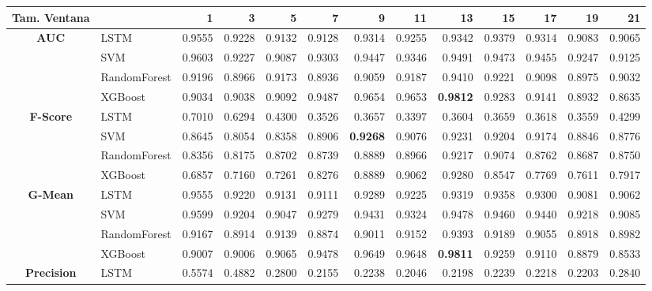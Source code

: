 \newpage
\begin{table}[h]
	\centering
	\begin{adjustbox}{max width=15cm}
		\begin{tabular}{|c|l|r|r|r|r|r|r|r|r|r|r|r|}
	\hline
	\textbf{Tam. Ventana}&         &      1  &      3  &      5  &      7  &      9  &      11 &      13 &      15 &      17 &      19 &      21 \\
	\hline
	\textbf{AUC} & LSTM &  0.9555 &  0.9228 &  0.9132 &  0.9128 &  0.9314 &  0.9255 &  0.9342 &  0.9379 &  0.9314 &  0.9083 &  0.9065 \\
	& SVM &  0.9603 &  0.9227 &  0.9087 &  0.9303 &  0.9447 &  0.9346 &  0.9491 &  0.9473 &  0.9455 &  0.9247 &  0.9125 \\
	& RandomForest &  0.9196 &  0.8966 &  0.9173 &  0.8936 &  0.9059 &  0.9187 &  0.9410 &  0.9221 &  0.9098 &  0.8975 &  0.9032 \\
	& XGBoost &  0.9034 &  0.9038 &  0.9092 &  0.9487 &  0.9654 &  0.9653 &  \textbf{0.9812} &  0.9283 &  0.9141 &  0.8932 &  0.8635 \\
	\hline
	\textbf{F-Score} & LSTM &  0.7010 &  0.6294 &  0.4300 &  0.3526 &  0.3657 &  0.3397 &  0.3604 &  0.3659 &  0.3618 &  0.3559 &  0.4299 \\
	& SVM &  0.8645 &  0.8054 &  0.8358 &  0.8906 &  \textbf{0.9268} &  0.9076 &  0.9231 &  0.9204 &  0.9174 &  0.8846 &  0.8776 \\
	& RandomForest &  0.8356 &  0.8175 &  0.8702 &  0.8739 &  0.8889 &  0.8966 &  0.9217 &  0.9074 &  0.8762 &  0.8687 &  0.8750 \\
	& XGBoost &  0.6857 &  0.7160 &  0.7261 &  0.8276 &  0.8889 &  0.9062 &  0.9280 &  0.8547 &  0.7769 &  0.7611 &  0.7917 \\
	\hline
	\textbf{G-Mean} & LSTM &  0.9555 &  0.9220 &  0.9131 &  0.9111 &  0.9289 &  0.9225 &  0.9319 &  0.9358 &  0.9300 &  0.9081 &  0.9062 \\
	& SVM &  0.9599 &  0.9204 &  0.9047 &  0.9279 &  0.9431 &  0.9324 &  0.9478 &  0.9460 &  0.9440 &  0.9218 &  0.9085 \\
	& RandomForest &  0.9167 &  0.8914 &  0.9139 &  0.8874 &  0.9011 &  0.9152 &  0.9393 &  0.9189 &  0.9055 &  0.8918 &  0.8982 \\
	& XGBoost &  0.9007 &  0.9006 &  0.9065 &  0.9478 &  0.9649 &  0.9648 &  \textbf{0.9811} &  0.9259 &  0.9110 &  0.8879 &  0.8533 \\
	\hline
	\textbf{Precision} & LSTM &  0.5574 &  0.4882 &  0.2800 &  0.2155 &  0.2238 &  0.2046 &  0.2198 &  0.2239 &  0.2218 &  0.2203 &  0.2840 \\

\end{tabular}
\end{adjustbox}
\end{table}
